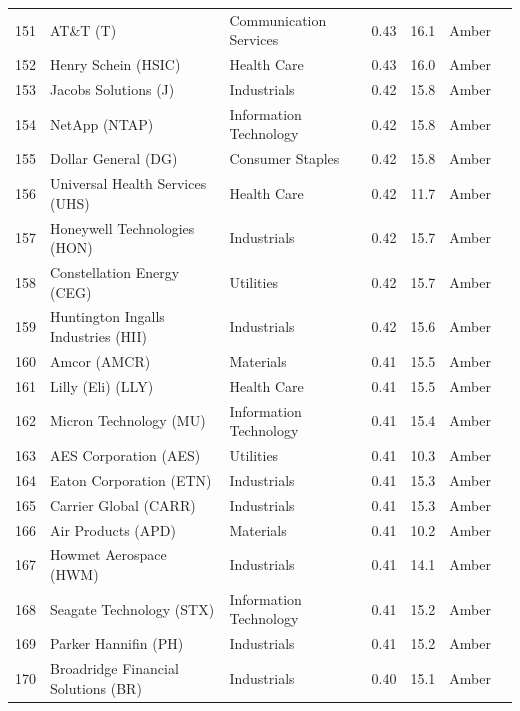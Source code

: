 \documentclass[11pt,a4paper]{article}
\begin{document}
{\begin{longtable}{r p{4.4cm} p{2.8cm} r r l l}
151 & AT\&T (T) & Communication Services & 0.43 & 16.1 & \cellcolor[HTML]{FFEB9C}Amber &  \\
152 & Henry Schein (HSIC) & Health Care & 0.43 & 16.0 & \cellcolor[HTML]{FFEB9C}Amber &  \\
153 & Jacobs Solutions (J) & Industrials & 0.42 & 15.8 & \cellcolor[HTML]{FFEB9C}Amber &  \\
154 & NetApp (NTAP) & Information Technology & 0.42 & 15.8 & \cellcolor[HTML]{FFEB9C}Amber &  \\
155 & Dollar General (DG) & Consumer Staples & 0.42 & 15.8 & \cellcolor[HTML]{FFEB9C}Amber &  \\
156 & Universal Health Services (UHS) & Health Care & 0.42 & 11.7 & \cellcolor[HTML]{FFEB9C}Amber &  \\
157 & Honeywell Technologies (HON) & Industrials & 0.42 & 15.7 & \cellcolor[HTML]{FFEB9C}Amber &  \\
158 & Constellation Energy (CEG) & Utilities & 0.42 & 15.7 & \cellcolor[HTML]{FFEB9C}Amber &  \\
159 & Huntington Ingalls Industries (HII) & Industrials & 0.42 & 15.6 & \cellcolor[HTML]{FFEB9C}Amber &  \\
160 & Amcor (AMCR) & Materials & 0.41 & 15.5 & \cellcolor[HTML]{FFEB9C}Amber &  \\
161 & Lilly (Eli) (LLY) & Health Care & 0.41 & 15.5 & \cellcolor[HTML]{FFEB9C}Amber &  \\
162 & Micron Technology (MU) & Information Technology & 0.41 & 15.4 & \cellcolor[HTML]{FFEB9C}Amber &  \\
163 & AES Corporation (AES) & Utilities & 0.41 & 10.3 & \cellcolor[HTML]{FFEB9C}Amber &  \\
164 & Eaton Corporation (ETN) & Industrials & 0.41 & 15.3 & \cellcolor[HTML]{FFEB9C}Amber &  \\
165 & Carrier Global (CARR) & Industrials & 0.41 & 15.3 & \cellcolor[HTML]{FFEB9C}Amber &  \\
166 & Air Products (APD) & Materials & 0.41 & 10.2 & \cellcolor[HTML]{FFEB9C}Amber &  \\
167 & Howmet Aerospace (HWM) & Industrials & 0.41 & 14.1 & \cellcolor[HTML]{FFEB9C}Amber &  \\
168 & Seagate Technology (STX) & Information Technology & 0.41 & 15.2 & \cellcolor[HTML]{FFEB9C}Amber &  \\
169 & Parker Hannifin (PH) & Industrials & 0.41 & 15.2 & \cellcolor[HTML]{FFEB9C}Amber &  \\
170 & Broadridge Financial Solutions (BR) & Industrials & 0.40 & 15.1 & \cellcolor[HTML]{FFEB9C}Amber &  \\

\end{longtable}}
\end{document}
